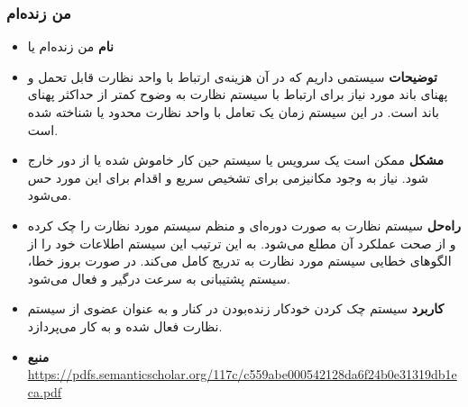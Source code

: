 \subsubsection{من زنده‌ام}
\begin{itemize}
\item \textbf{نام} \newline
من زنده‌ام یا 
\item \textbf{توضیحات} \newline
سیستمی داریم که در آن هزینه‌ی ارتباط با واحد نظارت قابل تحمل و پهنای باند مورد نیاز برای ارتباط با سیستم نظارت به وضوح کمتر از حداکثر پهنای باند است. در این سیستم زمان یک تعامل با واحد نظارت محدود یا شناخته شده است.
\item \textbf{مشکل} \newline
ممکن است یک سرویس یا سیستم حین کار خاموش شده یا از دور خارج شود. نیاز به وجود مکانیزمی برای تشخیص سریع و اقدام برای این مورد حس می‌شود.
\item \textbf{راه‌حل} \newline
سیستم نظارت به صورت دوره‌ای و منظم سیستم مورد نظارت را چک کرده و از صحت عملکرد آن مطلع می‌شود. به این ترتیب این سیستم اطلاعات خود را از الگو‌های خطایی سیستم مورد نظارت به تدریج کامل می‌کند. در صورت بروز خطا، سیستم پشتیبانی به سرعت درگیر و فعال می‌شود.
\item \textbf{کاربرد} \newline
سیستم چک کردن خودکار زنده‌بودن در کنار و به عنوان عضوی از سیستم نظارت فعال شده و به کار می‌پردازد.
\item \textbf{منبع} \newline
\url{https://pdfs.semanticscholar.org/117c/c559abe000542128da6f24b0e31319db1eca.pdf}
\end{itemize}

